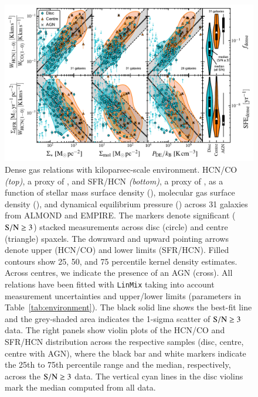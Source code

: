 \documentclass[letter, longauth]{aa} %
\begin{document}
\begin{figure}
\centering
\includegraphics[width=\textwidth]{Figures/HCN_scaling_relations_centre_vs_disc_compressed_v2.pdf}
\caption{Dense gas relations with kiloparsec-scale environment. 
HCN/CO \textit{(top)}, a proxy of \fdense, and SFR/HCN \textit{(bottom)}, a proxy of \sfedense, as a function of stellar mass surface density (\sigstar), molecular gas surface density (\sigmol), and dynamical equilibrium pressure (\pde) across 31 galaxies from ALMOND and EMPIRE.
The markers denote significant ($\mathrm{S}/\mathrm{N}\geq 3$) stacked measurements across disc (circle) and centre (triangle) spaxels.
The downward and upward pointing arrows denote upper (HCN/CO) and lower limits (SFR/HCN).
Filled contours show 25, 50, and 75 percentile kernel density estimates.
Across centres, we indicate the presence of an AGN (cross).
All relations have been fitted with \texttt{LinMix} taking into account measurement uncertainties and upper/lower limits (parameters in Table~\ref{tab:environment}).
The black solid line shows the best-fit line and the grey-shaded area indicates the 1-sigma scatter of $\mathrm{S}/\mathrm{N}\geq 3$ data.
The right panels show violin plots of the HCN/CO and SFR/HCN distribution across the respective samples (disc, centre, centre with AGN), where the black bar and white markers indicate the 25th to 75th percentile range and the median, respectively, across the $\mathrm{S}/\mathrm{N}\geq 3$ data.
The vertical cyan lines in the disc violins mark the median computed from all \snr data.
}
\label{fig:hcn_scaling_relations}
\end{figure}

\end{document}
